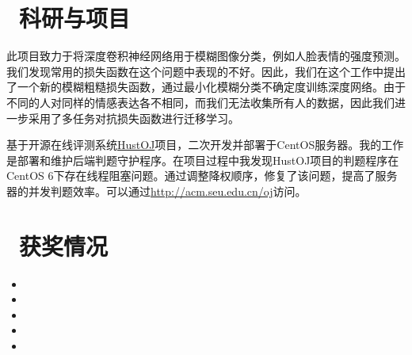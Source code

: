 \documentclass{resume}
\begin{document}
\section{\faSearch\ 科研与项目}
\begin{onehalfspacing}
	此项目致力于将深度卷积神经网络用于模糊图像分类，例如人脸表情的强度预测。我们发现常用的损失函数在这个问题中表现的不好。因此，我们在这个工作中提出了一个新的模糊粗糙损失函数，通过最小化模糊分类不确定度训练深度网络。由于不同的人对同样的情感表达各不相同，而我们无法收集所有人的数据，因此我们进一步采用了多任务对抗损失函数进行迁移学习。
\end{onehalfspacing}
\begin{onehalfspacing}
	基于开源在线评测系统\href{https://github.com/zhblue/hustoj}{HustOJ}项目，二次开发并部署于CentOS服务器。我的工作是部署和维护后端判题守护程序。在项目过程中我发现HustOJ项目的判题程序在CentOS 6下存在线程阻塞问题。通过调整降权顺序，修复了该问题，提高了服务器的并发判题效率。可以通过\href{http://acm.seu.edu.cn/oj/}{http://acm.seu.edu.cn/oj}访问。
\end{onehalfspacing}

\section{\faHeartO\ 获奖情况}
\begin{itemize}[parsep=0.5ex]
	\item {}
	\item {}
	\item {}
	\item {}
	\item {}
\end{itemize}
\end{document}
